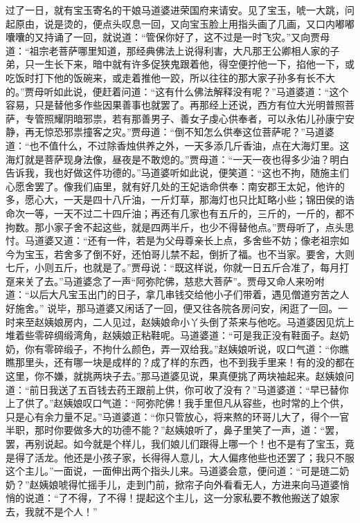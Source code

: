 \documentclass[12pt,oneside]{book}
\begin{document}
过了一日，就有宝玉寄名的干娘马道婆进荣国府来请安。见了宝玉，唬一大跳，问起原由，说是烫的，便点头叹息一回，又向宝玉脸上用指头画了几画，又口内嘟嘟囔囔的又持诵了一回，就说道：“管保你好了，这不过是一时飞灾。”又向贾母道：“祖宗老菩萨哪里知道，那经典佛法上说得利害，大凡那王公卿相人家的子弟，只一生长下来，暗中就有许多促狭鬼跟着他，得空便拧他一下，掐他一下，或吃饭时打下他的饭碗来，或走着推他一跤，所以往往的那大家子孙多有长不大的。”贾母听如此说，便赶着问道：“这有什么佛法解释没有呢？”马道婆道：“这个容易，只是替他多作些因果善事也就罢了。再那经上还说，西方有位大光明普照菩萨，专管照耀阴暗邪祟，若有那善男子、善女子虔心供奉者，可以永佑儿孙康宁安静，再无惊恐邪祟撞客之灾。”贾母道：“倒不知怎么供奉这位菩萨呢？”马道婆道：“也不值什么，不过除香烛供养之外，一天多添几斤香油，点在大海灯里。这海灯就是菩萨现身法像，昼夜是不敢熄的。”贾母道：“一天一夜也得多少油？明白告诉我，我也好做这件功德的。”马道婆听如此说，便笑道：“这也不拘，随施主们心愿舍罢了。像我们庙里，就有好几处的王妃诰命供奉：南安郡王太妃，他许的多，愿心大，一天是四十八斤油，一斤灯草，那海灯也只比缸略小些；锦田侯的诰命次一等，一天不过二十四斤油；再还有几家也有五斤的，三斤的，一斤的，都不拘数。那小家子舍不起这些，就是四两半斤，也少不得替他点。”贾母听了，点头思忖。马道婆又道：“还有一件，若是为父母尊亲长上点，多舍些不妨；像老祖宗如今为宝玉，若舍多了倒不好，还怕哥儿禁不起，倒折了福。也不当家。要舍，大则七斤，小则五斤，也就是了。”贾母说：“既这样说，你就一日五斤合准了，每月打趸来关了去。”马道婆念了一声“阿弥陀佛，慈悲大菩萨”。贾母又命人来吩咐道：“以后大凡宝玉出门的日子，拿几串钱交给他小子们带着，遇见僧道穷苦之人好施舍。”
说毕，那马道婆又闲话了一回，便又往各院各房问安，闲逛了一回。一时来至赵姨娘房内，二人见过，赵姨娘命小丫头倒了茶来与他吃。马道婆因见炕上堆着些零碎绸缎湾角，赵姨娘正粘鞋呢。马道婆道：“可是我正没有鞋面子。赵奶奶，你有零碎缎子，不拘什么颜色，弄一双给我。”赵姨娘听说，叹口气道：“你瞧瞧那里头，还有哪一块是成样的？成了样的东西，也不到我手里来！有的没的都在这里，你不嫌，就挑两块子去。”那马道婆见说，果真便挑了两块袖起来。赵姨娘问道：“前日我送了五百钱去药王跟前上供，你可收了没有？”马道婆道：“早已替你上了供了。”赵姨娘叹口气道：“阿弥陀佛！我手里但凡从容些，也时常的上个供，只是心有余力量不足。”马道婆道：“你只管放心，将来熬的环哥儿大了，得个一官半职，那时你要做多大的功德不能？”赵姨娘听了，鼻子里笑了一声，道：“罢，罢，再别说起。如今就是个样儿，我们娘儿们跟得上哪一个！也不是有了宝玉，竟是得了活龙。他还是小孩子家，长得得人意儿，大人偏疼他些也还罢了；我只不服这个主儿。”一面说，一面伸出两个指头儿来。马道婆会意，便问道：“可是琏二奶奶？”赵姨娘唬得忙摇手儿，走到门前，掀帘子向外看看无人，方进来向马道婆悄悄的说道：“了不得，了不得！提起这个主儿，这一分家私要不教他搬送了娘家去，我就不是个人！”
\end{document}
